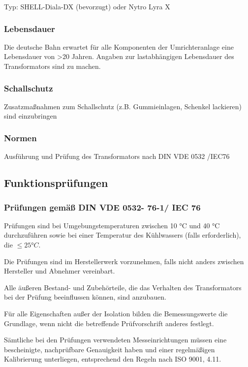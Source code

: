 Typ:	 SHELL-Diala-DX (bevorzugt) oder Nytro Lyra X 

\subsubsection*{Lebensdauer}
Die deutsche Bahn erwartet für alle Komponenten der Umrichteranlage eine Lebensdauer von >20 Jahren. Angaben zur lastabhängigen Lebensdauer des Transformators sind zu machen. 

\subsubsection*{Schallschutz}
Zusatzmaßnahmen zum Schallschutz (z.B. Gummieinlagen, Schenkel lackieren) sind einzubringen

\subsubsection*{Normen}
Ausführung und Prüfung des Transformators nach DIN VDE 0532 /IEC76 
\subsection{Funktionsprüfungen}
\subsubsection*{Prüfungen gemäß DIN VDE 0532- 76-1/ IEC 76}
Prüfungen sind bei Umgebungstemperaturen zwischen 10 °C und 40 °C durchzuführen sowie bei einer
Temperatur des Kühlwassers (falls erforderlich), die $\leq \ang{25}C $.

Die Prüfungen sind im Herstellerwerk vorzunehmen, falls nicht anders zwischen Hersteller und Abnehmer
vereinbart.

Alle äußeren Bestand- und Zubehörteile, die das Verhalten des Transformators bei der Prüfung beeinflussen
können, sind anzubauen.

Für alle Eigenschaften außer der Isolation bilden die Bemessungswerte die Grundlage, wenn nicht die
betreffende Prüfvorschrift anderes festlegt.

Sämtliche bei den Prüfungen verwendeten Messeinrichtungen müssen eine bescheinigte, nachprüfbare
Genauigkeit haben und einer regelmäßigen Kalibrierung unterliegen, entsprechend den Regeln nach
ISO 9001, 4.11.\cite*{DINEN600761.}
